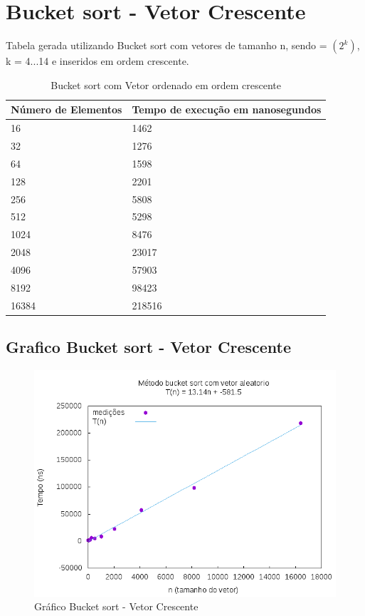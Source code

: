 \documentclass[12pt,a4paper,twoside]{report}
\begin{document}
\section{Bucket sort - Vetor Crescente}
Tabela gerada utilizando Bucket sort com vetores de tamanho n, sendo = $(2^k)$, k = 4...14 e inseridos em ordem crescente.

\begin{table}[H]
\centering
\caption{Bucket sort com Vetor ordenado em ordem crescente}
\label{my-label}
\begin{tabular}{|l|l|}
\hline
\multicolumn{1}{|c|}{\textbf{Número de Elementos}} & \multicolumn{1}{c|}{\textbf{Tempo de execução em nanosegundos}} \\ \hline
16 & 1462 \\ \hline
32 & 1276 \\ \hline
64 & 1598 \\ \hline
128 & 2201 \\ \hline
256 & 5808 \\ \hline
512 & 5298 \\ \hline
1024 & 8476 \\ \hline
2048 & 23017 \\ \hline
4096 & 57903 \\ \hline
8192 & 98423 \\ \hline
16384 & 218516 \\ \hline
\end{tabular}
\end{table}

\subsection{Grafico Bucket sort - Vetor Crescente}
\begin{figure}[H]
    \centering
    \includegraphics[width=0.7\linewidth]{graficos/Bucket/vIntCrescente/vIntCrescente.png}
  \caption{Gráfico Bucket sort - Vetor Crescente}
\end{figure}
\end{document}
